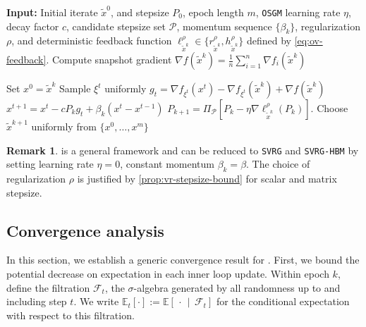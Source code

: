 \documentclass{article}
\theoremstyle{definition}
\newtheorem{remark}[remark]{Remark}
\DeclareRobustCommand{\namerefc}[2]{\hyperref[#2]{\textcolor{#1}{\nameref*{#2}}}}
\newcommand{\ov}{\namerefc{purple}{alg:osgm-svrg}}
\newcommand{\os}{\texttt{OSGM}}
\newcommand{\svrg}{\texttt{SVRG}}
\newcommand{\sh}{\texttt{SVRG-HBM}}
\begin{document}
\begin{algorithm}[ht!]
\caption{\texttt{OSGM-SVRG}}
\label{alg:osgm-svrg}
\begin{algorithmic}[1]
\STATE \textbf{Input:} Initial iterate $\tilde{x}^0$, and stepsize $P_0$, epoch length $m$, {\os} learning rate $\eta$, decay factor $c$, candidate stepsize set $\mathcal{P}$, momentum sequence $\{\beta_k\}$, regularization $\rho$, and deterministic feedback function $\ell_{\tilde{x}^k}^{\rho} \in \{ r_{\tilde{x}^k}^{\rho}, h_{\tilde{x}^k}^{\rho} \}$ defined by \eqref{eq:ov-feedback}.
    \STATE Compute snapshot gradient $\nabla f(\tilde{x}^k) = \tfrac1n\sum_{i=1}^n \nabla f_i(\tilde{x}^k)$
    
    \STATE Set $x^0 = \tilde{x}^k$
        \STATE Sample $\xi^t$ uniformly
        \STATE
        $
            g_t = \nabla f_{\xi^t}(x^t) - \nabla f_{\xi^t}(\tilde{x}^k) + \nabla f(\tilde{x}^k)
        $
        \STATE 
        $
            x^{t+1}
            =
            x^t
            - c P_k g_t
            + \beta_k (x^t - x^{t-1})
        $
    \ENDFOR
    \STATE
    $
    P_{k+1} = \Pi_{\mathcal{P}}
        [
            P_{k}
            - \eta \nabla \ell_{\tilde{x}^{k}}^{\rho} (P_{k})
        ].
    $
    \STATE Choose $\tilde{x}^{k+1}$ uniformly from $\{x^0,\dots,x^m\}$
\ENDFOR
\end{algorithmic}
\end{algorithm}

\begin{remark}
  {\ov} is a general framework and can be reduced to {\svrg} and {\sh} by setting learning rate $\eta=0$, constant momentum $\beta_k=\beta$. The choice of regularization $\rho$ is justified by \cref{prop:vr-stepsize-bound} for scalar and matrix stepsize.
\end{remark}

\subsection{Convergence analysis}

In this section, we establish a generic convergence result for {\ov}. First, we bound the potential decrease on expectation in each inner loop update. Within epoch $k$, define the filtration $\mathcal{F}_t$, the $\sigma$-algebra generated by all randomness up to and including step $t$. We write
\(
    \mathbb{E}_t[\cdot]
    :=
    \mathbb{E}\!\left[\,\cdot \,\middle|\, \mathcal{F}_t \right]
\)
for the conditional expectation with respect to this filtration.
\end{document}
